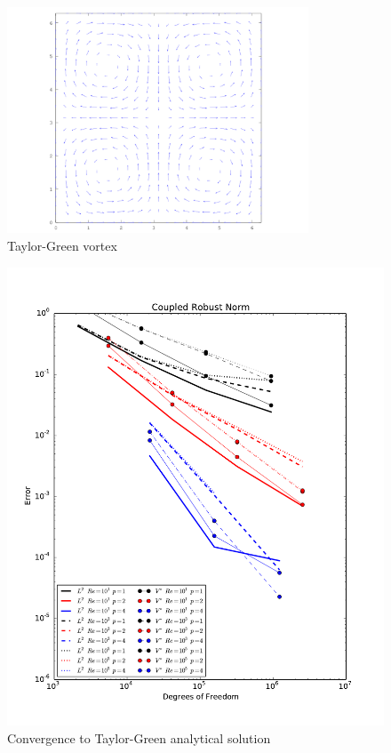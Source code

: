 \documentclass[Dissertation.tex]{subbIles}
\begin{document}
\begin{figure}
\centering
\includegraphics[width=0.8\textwidth]{Incompressible/TaylorGreen/Taylor-Green_vortex_vector_plot.png}
\caption{Taylor-Green vortex}
\label{fig:TaylorGreenVortex}
\end{figure}

\begin{figure}
\centering
\includegraphics[width=\textwidth]{Incompressible/TaylorGreen/coupledrobust_convergence.pdf}
\caption{Convergence to Taylor-Green analytical solution}
\label{fig:TaylorGreenConvergence}
\end{figure}
\end{document}
